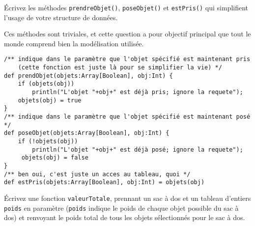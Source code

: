 \documentclass[10pt]{article}\usepackage[correction,nu]{esial}
\begin{document}


\Question Écrivez les méthodes \texttt{prendreObjet()}, \texttt{poseObjet()} et
\texttt{estPris()} qui simplifient l'usage de votre structure de données.

\begin{Reponse}
  Ces méthodes sont triviales, et cette question a pour objectif principal que
  tout le monde comprend bien la modélisation utilisée.
  \begin{Verbatim}
/** indique dans le paramètre que l'objet spécifié est maintenant pris
    (cette fonction est juste là pour se simplifier la vie) */
def prendObjet(objets:Array[Boolean], obj:Int) {
    if (objets(obj)) 
        println("L'objet "+obj+" est déjà pris; ignore la requete");
    objets(obj) = true
}
/** indique dans le paramètre que l'objet spécifié est maintenant posé */
def poseObjet(objets:Array[Boolean], obj:Int) {
    if (!objets(obj)) 
        println("L'objet "+obj+" est déjà posé; ignore la requete");
     objets(obj) = false
}
/** ben oui, c'est juste un acces au tableau, quoi */
def estPris(objets:Array[Boolean], obj:Int) = objets(obj)
  \end{Verbatim}
\end{Reponse}

\Question Écrivez une fonction \texttt{valeurTotale}, prennant un sac à dos et
un tableau d'entiers \texttt{poids} en paramètre (\texttt{poids} indique le
poids de chaque objet possible du sac à dos) et renvoyant le poids total de tous
les objets sélectionnés pour le sac à dos.
\end{document}
